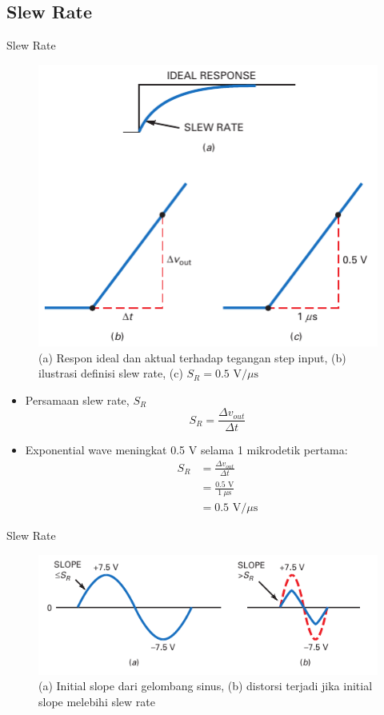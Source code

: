 \subsection{Slew Rate}
\begin{frame}{Slew Rate}
	\begin{multicols}{2}
		\begin{figure}
			\centering
			\includegraphics[width=0.8\linewidth]{gambar/fig-16.08}
			\caption{(a) Respon ideal dan aktual terhadap tegangan step input, (b) ilustrasi definisi slew rate, (c) $ S_R = 0.5 \text{ V/}\mu\text{s} $}
			\label{fig-16.08}
		\end{figure}
		\columnbreak
		\begin{itemize}
			\item Persamaan slew rate, $ S_R $
			\begin{equation}\label{pers.16.1}
				S_R = \frac{\Delta v_{out}}{\Delta t}
			\end{equation}
			\item Exponential wave meningkat 0.5 V selama 1 mikrodetik pertama:
			\begin{align*}
				S_R &= \frac{\Delta v_{out}}{\Delta t} \\
				&= \frac{0.5 \text{ V}}{1~\mu\text{s}} \\
				&= 0.5 \text{ V/}\mu\text{s}
			\end{align*}
		\end{itemize}
	\end{multicols}
\end{frame}

\begin{frame}{Slew Rate}
	\begin{figure}
		\centering
		\includegraphics[width=0.7\linewidth]{gambar/fig-16.09}
		\caption{(a) Initial slope dari gelombang sinus, (b) distorsi terjadi jika initial slope melebihi slew rate}
		\label{fig-16.09}
	\end{figure}
\end{frame}

